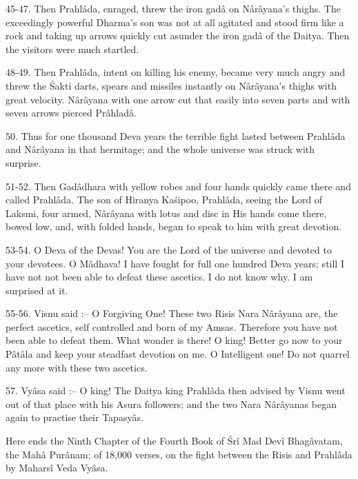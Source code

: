 45-47. Then Prahl\^ada, enraged, threw the iron gad\^a on N\^ar\^ayana's thighs. The exceedingly powerful Dharma's son was not at all agitated and stood firm like a rock and taking up arrows quickly cut asunder the iron gad\^a of the Daitya. Then the visitors were much startled.

48-49. Then Prahl\^ada, intent on killing his enemy, became very much angry and threw the \'Sakti darts, spears and missiles instantly on N\^ar\^ayana's thighs with great velocity. N\^ar\^ayana with one arrow cut that easily into seven parts and with seven arrows pierced Pr\^ahlad\^a.

50. Thus for one thousand Deva years the terrible fight lasted between Prahl\^ada and N\^ar\^ayana in that hermitage; and the whole universe was struck with surprise.

51-52. Then Gad\^adhara with yellow robes and four hands quickly came there and called Prahl\^ada. The son of Hiranya Ka\'sipoo, Prahl\^ada, seeing the Lord of Laksmi, four armed, N\^ar\^ayana with lotus and disc in His hands come there, bowed low, and, with folded hands, began to speak to him with great devotion.

53-54. O Deva of the Devas! You are the Lord of the universe and devoted to your devotees. O M\^adhava! I have fought for full one hundred Deva years; still I have not not been able to defeat these ascetics. I do not know why. I am surprised at it.

55-56. Visnu said :-- O Forgiving One! These two Risis Nara N\^ar\^ayana are, the perfect ascetics, self controlled and born of my Amsas. Therefore you have not been able to defeat them. What wonder is there! O king! Better go now to your P\^at\^ala and keep your steadfast devotion on me. O Intelligent one! Do not quarrel any more with these two ascetics.

57. Vy\^asa said :-- O king! The Daitya king Prahl\^ada then advised by Visnu went out of that place with his Asura followers; and the two Nara N\^ar\^ayanas began again to practise their Tapasy\^as.

Here ends the Ninth Chapter of the Fourth Book of \'Sr\^i Mad Dev\^i Bhag\^avatam, the Mah\^a Pur\^anam; of 18,000 verses, on the fight between the Risis and Prahl\^ada by Mahars\^i Veda Vy\^asa.

